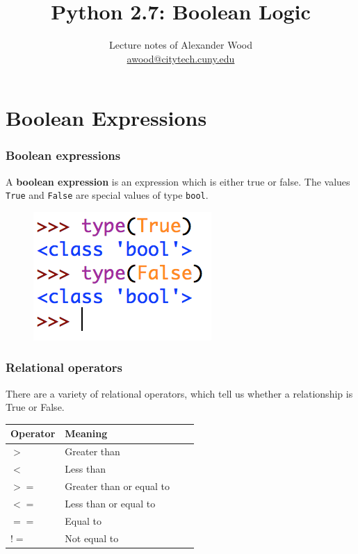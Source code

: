 \documentclass{beamer}
\title[Boolean Logic]{Python 2.7: Boolean Logic}
\subtitle{}
\author
{Lecture notes of Alexander Wood \\ \scriptsize \href{mailto:awood@citytech.cuny.edu}{awood@citytech.cuny.edu}}
\institute[CityTech]{New York City College of Technology }
\date{}
\begin{document}
\begin{frame}
  \titlepage
\end{frame}

\section{Boolean Expressions}

\begin{frame}[fragile]
\frametitle{Boolean expressions}

A \textbf{boolean expression} is an expression which is either true or false. The values \verb|True| and \verb|False| are special values of type \verb|bool|.
\begin{figure}\centering
\includegraphics[scale=.8]{IMG/1.png}
\end{figure}
\end{frame}

\begin{frame}
\frametitle{Relational operators}

There are a variety of relational operators, which tell us whether a relationship is True or False.

\vspace{4mm}
\begin{tabular}{l*{2}{l}r}
\textbf{Operator   }           & \textbf{Meaning}  \\
\hline
$>$ & Greater than  \\
$<$  & Less than  \\
$>=$  & Greater than or equal to   \\
$<=$ & Less than or equal to   \\
$==$ & Equal to\\
$!=$ & Not equal to
\end{tabular}
\end{frame}
\end{document}
